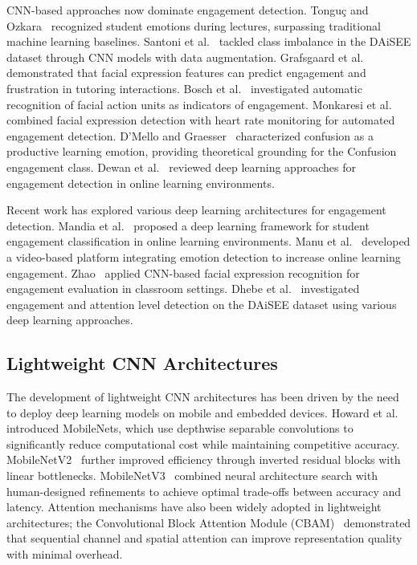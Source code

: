 \documentclass[apajournal,article,submit,pdftex,moreauthors]{Definitions/mdpi}
\begin{document}
CNN-based approaches now dominate engagement detection. Tongu\c{c} and Ozkara~\citep{tonguc2020automatic} recognized student emotions during lectures, surpassing traditional machine learning baselines. Santoni et al.~\citep{santoni2023cnn} tackled class imbalance in the DAiSEE dataset through CNN models with data augmentation. Grafsgaard et al.~\citep{grafsgaard2013automatically} demonstrated that facial expression features can predict engagement and frustration in tutoring interactions. Bosch et al.~\citep{bosch2015automatic} investigated automatic recognition of facial action units as indicators of engagement. Monkaresi et al.~\citep{monkaresi2017automated} combined facial expression detection with heart rate monitoring for automated engagement detection. D'Mello and Graesser~\citep{dmello2012auto} characterized confusion as a productive learning emotion, providing theoretical grounding for the Confusion engagement class. Dewan et al.~\citep{dewan2019deep} reviewed deep learning approaches for engagement detection in online learning environments.

Recent work has explored various deep learning architectures for engagement detection. Mandia et al.~\citep{mandia2024deep} proposed a deep learning framework for student engagement classification in online learning environments. Manu et al.~\citep{manu2026video} developed a video-based platform integrating emotion detection to increase online learning engagement. Zhao~\citep{zhao2025classroom} applied CNN-based facial expression recognition for engagement evaluation in classroom settings. Dhebe et al.~\citep{dhebe2025engagement} investigated engagement and attention level detection on the DAiSEE dataset using various deep learning approaches.

\subsection{Lightweight CNN Architectures}

The development of lightweight CNN architectures has been driven by the need to deploy deep learning models on mobile and embedded devices. Howard et al.~\citep{howard2017mobilenets} introduced MobileNets, which use depthwise separable convolutions to significantly reduce computational cost while maintaining competitive accuracy. MobileNetV2~\citep{sandler2018mobilenetv2} further improved efficiency through inverted residual blocks with linear bottlenecks. MobileNetV3~\citep{howard2019mobilenetv3} combined neural architecture search with human-designed refinements to achieve optimal trade-offs between accuracy and latency. Attention mechanisms have also been widely adopted in lightweight architectures; the Convolutional Block Attention Module (CBAM)~\citep{woo2018cbam} demonstrated that sequential channel and spatial attention can improve representation quality with minimal overhead.
\end{document}
